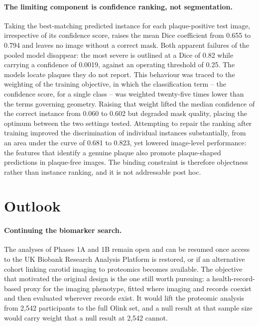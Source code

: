 \paragraph{The limiting component is confidence ranking, not segmentation.}
Taking the best-matching predicted instance for each plaque-positive test image, irrespective of
its confidence score, raises the mean Dice coefficient from 0.655 to 0.794 and leaves no image
without a correct mask. Both apparent failures of the pooled model disappear: the most severe is
outlined at a Dice of 0.82 while carrying a confidence of 0.0019, against an operating threshold
of 0.25. The models locate plaques they do not report. This behaviour was traced to the weighting
of the training objective, in which the classification term -- the confidence score, for a single
class -- was weighted twenty-five times lower than the terms governing geometry. Raising that
weight lifted the median confidence of the correct instance from 0.060 to 0.602 but degraded mask
quality, placing the optimum between the two settings tested. Attempting to repair the ranking
after training improved the discrimination of individual instances substantially, from an area
under the curve of 0.681 to 0.823, yet lowered image-level performance: the features that
identify a genuine plaque also promote plaque-shaped predictions in plaque-free images. The
binding constraint is therefore objectness rather than instance ranking, and it is not
addressable post hoc.

\section{Outlook}
\label{sec:conclusion-outlook}

\paragraph{Continuing the biomarker search.}
The analyses of Phases 1A and 1B remain open and can be resumed once access to the UK Biobank
Research Analysis Platform is restored, or if an alternative cohort linking carotid imaging to
proteomics becomes available. The objective that motivated the original design is the one still
worth pursuing: a health-record-based proxy for the imaging phenotype, fitted where imaging and
records coexist and then evaluated wherever records exist. It would lift the proteomic analysis
from 2{,}542 participants to the full Olink set, and a null result at that sample size would
carry weight that a null result at 2{,}542 cannot.

